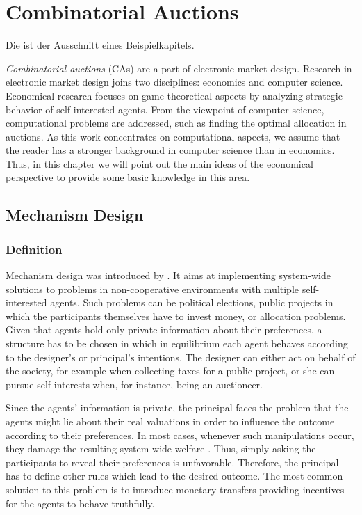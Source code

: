 \chapter{Combinatorial Auctions}
\label{chap:combinatorialAuctions}

Die ist der Ausschnitt eines Beispielkapitels.

\emph{Combinatorial auctions} (CAs) are a part of electronic
market design. Research in electronic market design joins two
disciplines: economics and computer science. Economical research
focuses on game theoretical aspects by analyzing strategic
behavior of self-interested agents. From the viewpoint of computer
science, computational problems are addressed, such as finding the
optimal allocation in auctions. As this work concentrates on
computational aspects, we assume that the reader has a stronger
background in computer science than in economics. Thus, in this
chapter we will point out the main ideas of the economical
perspective to provide some basic knowledge in this area.

\section{Mechanism Design}
\subsection{Definition}
Mechanism design was introduced by \textcite{Hu60}. It
aims at implementing system-wide solutions to problems in
non-cooperative environments with multiple self-interested agents.
Such problems can be political elections, public projects in which
the participants themselves have to invest money, or allocation
problems. Given that agents hold only private information about
their preferences, a structure has to be chosen in which in
equilibrium each agent behaves according to the designer's or principal's
intentions. The designer can either act on behalf of the society, for
example when collecting taxes for a public project, or she can
pursue self-interests when, for instance, being an auctioneer.

Since the agents' information is private, the principal faces the
problem that the agents might lie about their real valuations in
order to influence the outcome according to their preferences. In
most cases, whenever such manipulations occur, they damage the
resulting system-wide welfare \parencite{NiRo00}. Thus, simply asking
the participants to reveal their preferences is unfavorable.
Therefore, the principal has to define other rules which lead to
the desired outcome. The most common solution to this problem is
to introduce monetary transfers providing incentives for the
agents to behave truthfully.

